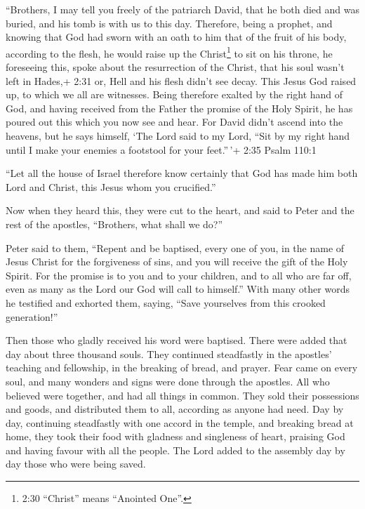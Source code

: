  ``Brothers, I may tell you freely of the patriarch David,
that he both died and was buried, and his tomb is with us to this day.
 Therefore, being a prophet, and knowing that God had sworn
with an oath to him that of the fruit of his body, according to the
flesh, he would raise up the Christ\footnote{2:30 ``Christ'' means
  ``Anointed One''.} to sit on his throne,  he foreseeing
this, spoke about the resurrection of the Christ, that his soul wasn't
left in Hades,+ 2:31 or, Hell and his flesh didn't see decay.
 This Jesus God raised up, to which we all are witnesses.
 Being therefore exalted by the right hand of God, and
having received from the Father the promise of the Holy Spirit, he has
poured out this which you now see and hear.  For David
didn't ascend into the heavens, but he says himself, `The Lord said to
my Lord, ``Sit by my right hand  until I make your enemies
a footstool for your feet.''\,'+ 2:35 Psalm 110:1

 ``Let all the house of Israel therefore know certainly
that God has made him both Lord and Christ, this Jesus whom you
crucified.''

 Now when they heard this, they were cut to the heart, and
said to Peter and the rest of the apostles, ``Brothers, what shall we
do?''

 Peter said to them, ``Repent and be baptised, every one of
you, in the name of Jesus Christ for the forgiveness of sins, and you
will receive the gift of the Holy Spirit.  For the promise
is to you and to your children, and to all who are far off, even as many
as the Lord our God will call to himself.''  With many
other words he testified and exhorted them, saying, ``Save yourselves
from this crooked generation!''

 Then those who gladly received his word were baptised.
There were added that day about three thousand souls.  They
continued steadfastly in the apostles' teaching and fellowship, in the
breaking of bread, and prayer.  Fear came on every soul,
and many wonders and signs were done through the apostles. 
All who believed were together, and had all things in common.
 They sold their possessions and goods, and distributed
them to all, according as anyone had need.  Day by day,
continuing steadfastly with one accord in the temple, and breaking bread
at home, they took their food with gladness and singleness of heart,
 praising God and having favour with all the people. The
Lord added to the assembly day by day those who were being saved.

